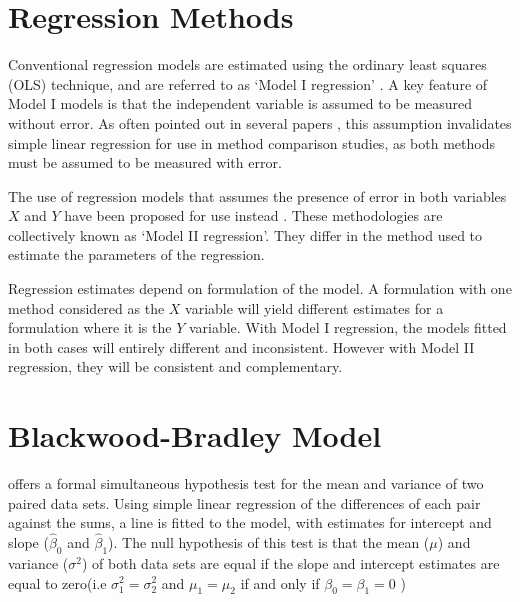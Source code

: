 \documentclass[12pt, a4paper]{report}
\theoremstyle{plain}
\theoremstyle{definition}
\theoremstyle{remark}
\begin{document}
	\section{Regression Methods}
	Conventional regression models are estimated using the ordinary
	least squares (OLS) technique, and are referred to as `Model I
	regression' \citep{CornCoch,ludbrook97}. A key feature of Model I
	models is that the independent variable is assumed to be measured
	without error. As often pointed out in several papers
	\citep{BA83,ludbrook97}, this assumption invalidates simple linear
	regression for use in method comparison studies, as both methods
	must be assumed to be measured with error.
	
	The use of regression models that assumes the presence of error in
	both variables $X$ and $Y$ have been proposed for use instead
	\citep{CornCoch,ludbrook97}. These methodologies are collectively
	known as `Model II regression'. They differ in the method used to
	estimate the parameters of the regression.
	
	Regression estimates depend on formulation of the model. A
	formulation with one method considered as the $X$ variable will
	yield different estimates for a formulation where it is the $Y$
	variable. With Model I regression, the models fitted in both cases
	will entirely different and inconsistent. However with Model II
	regression, they will be consistent and complementary.
	
\section{Blackwood-Bradley Model} 
\citet{BB89} offers a formal simultaneous hypothesis test for the
mean and variance of two paired data sets. Using simple linear
regression of the differences of each pair against the sums, a
line is fitted to the model, with estimates for intercept and
slope ($\hat{\beta}_{0}$ and $\hat{\beta}_{1}$). The null
hypothesis of this test is that the mean ($\mu$) and variance
($\sigma^{2}$) of both data sets are equal if the slope and
intercept estimates are equal to zero(i.e $\sigma^{2}_{1} =
\sigma^{2}_{2}$ and $\mu_{1}=\mu_{2}$ if and only if $\beta_{0}=
\beta_{1}=0$ )	
\end{document}
